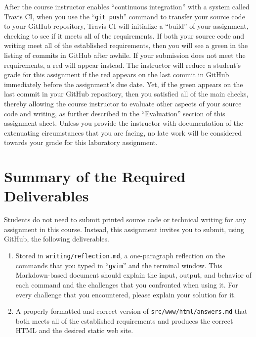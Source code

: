 \documentclass[11pt]{article}
\newcommand{\mainprogramsource}{\lstinline{src/www/html/answers.md}}
\newcommand{\reflection}{\lstinline{writing/reflection.md}}
\newcommand{\gitpush}{\command{git push}}
\newcommand{\command}[1]{``\lstinline{#1}''}
\newcommand{\step}[1]{``{#1}''}
\newcommand{\checkmark}{\ding{51}}
\newcommand{\naughtmark}{\ding{55}}
\begin{document}
After the course instructor enables \step{continuous integration} with a system called Travis CI, when you use the
\gitpush{} command to transfer your source code to your GitHub repository, Travis CI will initialize a \step{build} of
your assignment, checking to see if it meets all of the requirements. If both your source code and writing meet all of
the established requirements, then you will see a green \checkmark{} in the listing of commits in GitHub after awhile.
If your submission does not meet the requirements, a red \naughtmark{} will appear instead. The instructor will reduce a
student's grade for this assignment if the red \naughtmark{} appears on the last commit in GitHub immediately before the
assignment's due date. Yet, if the green \checkmark{} appears on the last commit in your GitHub repository, then you
satisfied all of the main checks, thereby allowing the course instructor to evaluate other aspects of your source code
and writing, as further described in the \step{Evaluation} section of this assignment sheet. Unless you provide the
instructor with documentation of the extenuating circumstances that you are facing, no late work will be considered
towards your grade for this laboratory assignment.

\section*{Summary of the Required Deliverables}

\noindent Students do not need to submit printed source code or technical writing for any assignment in this course.
Instead, this assignment invites you to submit, using GitHub, the following deliverables.

\begin{enumerate}

\setlength{\itemsep}{0in}

\item Stored in \reflection{}, a one-paragraph reflection on the commands that you typed in \command{gvim} and the
  terminal window. This Markdown-based document should explain the input, output, and behavior of each command and the
  challenges that you confronted when using it. For every challenge that you encountered, please explain your solution
  for it.

\item A properly formatted and correct version of \mainprogramsource{} that both meets all of the established
  requirements and produces the correct HTML and the desired static web site.

\end{enumerate}
\end{document}
